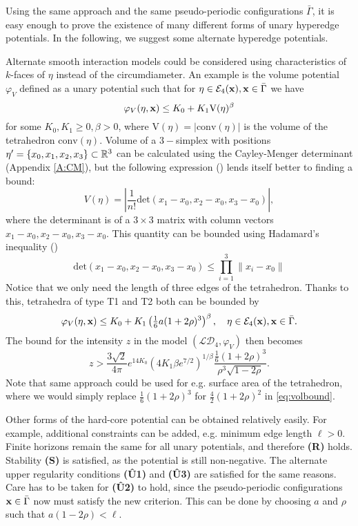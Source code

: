 Using the same approach and the same pseudo-periodic configurations $\bar\Gamma$, it is easy enough to prove the existence of many different forms of unary hyperedge potentials. In the following, we suggest some alternate hyperedge potentials. 
\begin{remark}
	
	Alternate smooth interaction models could be considered using characteristics of $k$-faces of $\eta$ instead of the circumdiameter. An example is the volume potential $\varphi_{V}$ defined as a unary potential such that for $\eta\in\mathcal E_4({\mathbf{x}}), {\mathbf{x}} \in \bar\Gamma$  we have
	$$\varphi_{V}(\eta,{\mathbf{x}}) \leq K_0 + K_1 \mathrm{V}(\eta)^{\beta}$$
	for some $K_0,K_1 \geq 0, \beta >0$, where $\mathrm{V}(\eta)=|\mathrm{conv}(\eta)|$ is the volume of the tetrahedron $\mathrm{conv}(\eta)$. Volume of a $3-$simplex with positions $\eta'=\{x_0,x_1,x_2,x_3\}\subset {\mathbb R^3}$ can be calculated using the Cayley-Menger determinant (Appendix \ref{A:CM}), but the following expression (\cite{Stein1966}) lends itself better to finding a bound: 
	$$V(\eta)=\left| \frac 1{n!} \mathrm{det}(x_1-x_0,x_2-x_0,x_3-x_0) \right|,$$
	where the determinant is of a $3 \times 3$ matrix with column vectors $x_1-x_0,x_2-x_0,x_3-x_0$. This quantity can be bounded using Hadamard's inequality (\cite{Hadamard1893})
	$$\mathrm{det}(x_1-x_0,x_2-x_0,x_3-x_0) \leq \prod^3_{i=1} \|x_i - x_0\| $$
	Notice that we only need the length of three edges of the tetrahedron. Thanks to this, tetrahedra of type T1 and T2 both can be bounded by
	$$\varphi_V(\eta,{\mathbf{x}}) \leq K_0 + K_1 \left(\tfrac 16 a(1+2\rho)^3\right)^{\beta}, \quad \eta\in\mathcal E_4({\mathbf{x}}), {\mathbf{x}}\in \bar \Gamma.$$
	The bound for the intensity $z$ in the model $(\mathcal {LD}_4, \varphi_V)$ then becomes
	\begin{equation}\label{eq:volbound}z> \frac{3\sqrt 2}{4\pi}e^{14 K_0}   (4K_1 \beta e^{7/2})^{1/\beta} \frac{\frac 16 (1+2\rho)^3}{\rho^3 \sqrt{1-2\rho}}.\end{equation}
	Note that same approach could be used for e.g. surface area of the tetrahedron, where we would simply replace $\tfrac 16 (1+2\rho)^3$ for $\tfrac 42 (1+2\rho)^2$ in \eqref{eq:volbound}.  \newline

\end{remark}


\begin{remark}
	Other forms of the hard-core potential can be obtained relatively easily. For example, additional constraints can be added, e.g. minimum edge length $\ell>0$. Finite horizons remain the same for all unary potentials, and therefore \textbf{(R)} holds. Stability \textbf{(S)} is satisfied, as the potential is still non-negative. The alternate upper regularity conditions \textbf{(\^{U}1)} and \textbf{(\^{U}3)} are satisfied for the same reasons. Care has to be taken for \textbf{(\^{U}2)} to hold, since the pseudo-periodic configurations ${\mathbf{x}}\in\bar \Gamma$ now must satisfy the new criterion. This can be done by choosing $a$ and $\rho$ such that $a(1-2\rho) < \ell$.
\end{remark}

